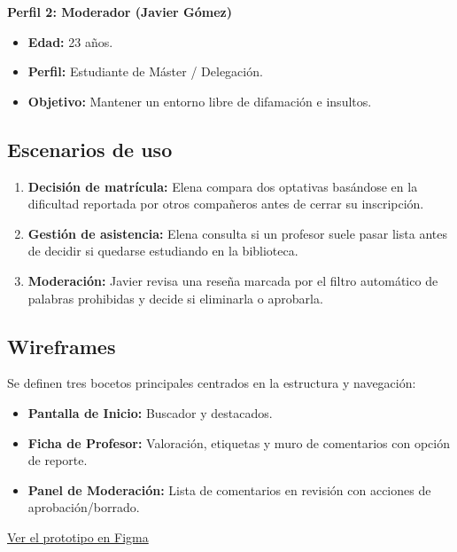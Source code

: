 \documentclass[12pt,oneside]{book}
\begin{document}
\textbf{Perfil 2: Moderador (Javier Gómez)}
\begin{itemize}
    \item \textbf{Edad:} 23 años.
    \item \textbf{Perfil:} Estudiante de Máster / Delegación.
    \item \textbf{Objetivo:} Mantener un entorno libre de difamación e insultos.
\end{itemize}

\subsection{Escenarios de uso} 
\begin{enumerate}
    \item \textbf{Decisión de matrícula:} Elena compara dos optativas basándose en la dificultad reportada por otros compañeros antes de cerrar su inscripción. 
    \item \textbf{Gestión de asistencia:} Elena consulta si un profesor suele pasar lista antes de decidir si quedarse estudiando en la biblioteca. 
    \item \textbf{Moderación:} Javier revisa una reseña marcada por el filtro automático de palabras prohibidas y decide si eliminarla o aprobarla.
\end{enumerate}

\subsection{Wireframes} 
Se definen tres bocetos principales centrados en la estructura y navegación:
\begin{itemize}
    \item \textbf{Pantalla de Inicio:} Buscador y destacados.
    \item \textbf{Ficha de Profesor:} Valoración, etiquetas y muro de comentarios con opción de reporte.
    \item \textbf{Panel de Moderación:} Lista de comentarios en revisión con acciones de aprobación/borrado.
\end{itemize}

\newpage

\href{https://www.figma.com/design/BfC4b74wlpLkhjCZ4KSV9J/UCOpiniones?node-id=3312-3&t=43l5RDpH6bo7hQIr-1}{Ver el prototipo en Figma}
\end{document}
